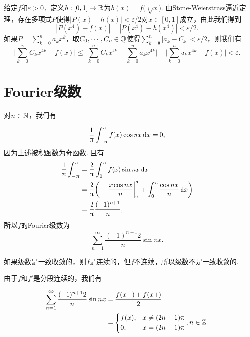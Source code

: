 \begin{ans}
  给定$f$和$\varepsilon>0$，定义$h:[0,1]\to\mathbb R$为$h(x)
  =f\big(\sqrt[4]{x}\big)$. 由Stone-Weierstrass逼近定理，存在多项式$P$使得$|P(x)-h(x)|<\varepsilon/2$对$x\in[0,1]$成立，由此我们得到
  \[
    | P(x^4)-f(x) | = |P(x^4)-h(x^4)| < \varepsilon/2.
  \]
  如果$P=\sum_{k=0}^na_kx^k$，取$C_0,\cdots,C_n\in\mathbb Q$使得$\sum_{k=0}^n|a_k-C_k|<\varepsilon/2$，则我们有
  \[
    \bigg|
      \sum_{k=0}^nC_kx^{4k} - f(x)
    \bigg| \le 
    \bigg|
      \sum_{k=0}^nC_kx^{4k} - \sum_{k=0}^n a_kx^{4k}
    \bigg| + 
    \bigg|
      \sum_{k=0}^na_kx^{4k} - f(x)
    \bigg| <\varepsilon.
  \]
\end{ans}

\section{Fourier级数}
\begin{ans}
  \begin{enumb}
    \item 对$n\in\mathbb N$，我们有
  \end{enumb}
    \[
      \frac1{\uppi}\int_{-\uppi}^\uppi f(x)\cos nx\,\mathrm dx = 0,
    \]
    因为上述被积函数为奇函数. 且有
    \begin{align*}
      \frac1{\uppi}\int_{-\uppi}^\uppi & = \frac2{\uppi}
      \int_0^\uppi f(x)\sin n x\,\mathrm dx \\
      & = \frac2{\uppi}\bigg(
        -\frac{x\cos nx}n\bigg|_0^\uppi  + 
        \int_0^\uppi\frac{\cos nx}n\,\mathrm dx
      \bigg) \\
      & = \frac2{\uppi}\frac{(-1)^{n+1}}n,
    \end{align*}
    所以$f$的Fourier级数为
    \[ \sum_{n=1}^\infty \frac{(-1)^{n+1}2}n\sin nx. \]
    \begin{enumc}
     \setcounter{enumi}{1}
     \item 如果级数是一致收敛的，则$f$是连续的，但$f$不连续，所以级数不是一致收敛的.
     \item 由于$f$和$f'$是分段连续的，我们有
    \end{enumc}
      \begin{align*}
        \sum_{n=1}^\infty \frac{(-1)^{n+1}2}n\sin nx
        & = \frac{f(x-)+f(x+)}2 \\
        & = \begin{cases}
          f(x), & x\ne (2n+1)\uppi\\
          0, & x= (2n+1)\uppi
        \end{cases},n\in\mathbb Z.
      \end{align*}
\end{ans}

